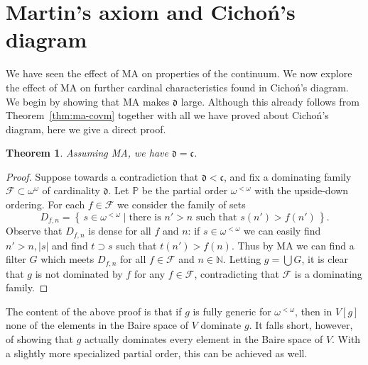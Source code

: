\documentclass[11pt,oneside]{amsbook}
\newcommand{\set}[1]{\left\{\,#1\,\right\}}
\newcommand{\N}{\mathbb N}
\newcommand{\PP}{\mathbb P}
\theoremstyle{definition}
\theoremstyle{plain}
\newtheorem{theorem}{Theorem}[section]
\theoremstyle{definition}
\theoremstyle{remark}
\numberwithin{equation}{section}
\numberwithin{figure}{section}
\begin{document}



\newpage
\section{Martin's axiom and Cicho\'n's diagram}

We have seen the effect of MA on properties of the continuum. We now explore the effect of MA on further cardinal characteristics found in Cicho\'n's diagram. We begin by showing that MA makes $\mathfrak d$ large. Although this already follows from Theorem~\ref{thm:ma-covm} together with all we have proved about Cicho\'n's diagram, here we give a direct proof.

\begin{theorem}
  \label{thm:ma-d}
  Assuming MA, we have $\mathfrak d=\mathfrak c$.
\end{theorem}

\begin{proof}
  Suppose towards a contradiction that $\mathfrak d<\mathfrak c$, and fix a dominating family $\mathcal F\subset\omega^\omega$ of cardinality $\mathfrak d$. Let $\PP$ be the partial order $\omega^{<\omega}$ with the upside-down ordering. For each $f\in\mathcal F$ we consider the family of sets
  \[D_{f,n}=\set{s\in\omega^{<\omega}\mid\text{there is $n'>n$ such that $s(n')>f(n')$}}\text{.}
  \]
  Observe that $D_{f,n}$ is dense for all $f$ and $n$: if $s\in\omega^{<\omega}$ we can easily find $n'>n,|s|$ and find $t\supset s$ such that $t(n')>f(n)$. Thus by MA we can find a filter $G$ which meets $D_{f,n}$ for all $f\in\mathcal F$ and $n\in\N$. Letting $g=\bigcup G$, it is clear that $g$ is not dominated by $f$ for any $f\in\mathcal F$, contradicting that $\mathcal F$ is a dominating family.
\end{proof}

The content of the above proof is that if $g$ is fully generic for $\omega^{<\omega}$, then in $V[g]$ none of the elements in the Baire space of $V$ dominate $g$. It falls short, however, of showing that $g$ actually dominates every element in the Baire space of $V$. With a slightly more specialized partial order, this can be achieved as well.
\end{document}
